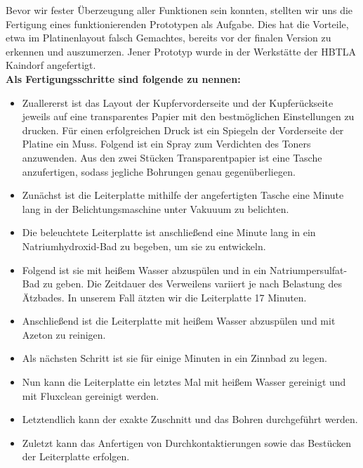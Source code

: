 Bevor wir fester Überzeugung aller Funktionen sein konnten, stellten wir uns die Fertigung eines funktionierenden Prototypen als Aufgabe.
Dies hat die Vorteile, etwa im Platinenlayout falsch Gemachtes, bereits vor der finalen Version zu erkennen und auszumerzen.
Jener Prototyp wurde in der Werkstätte der HBTLA Kaindorf angefertigt. \\

\textbf{Als Fertigungsschritte sind folgende zu nennen:}

\begin{itemize}
\item Zuallererst ist das Layout der Kupfervorderseite und der Kupferückseite jeweils auf eine transparentes Papier mit den bestmöglichen Einstellungen zu drucken.
Für einen erfolgreichen Druck ist ein Spiegeln der Vorderseite der Platine ein Muss.
Folgend ist ein Spray zum Verdichten des Toners anzuwenden.
Aus den zwei Stücken Transparentpapier ist eine Tasche anzufertigen, sodass jegliche Bohrungen genau gegenüberliegen. \\

\item Zunächst ist die Leiterplatte mithilfe der angefertigten Tasche eine Minute lang in der Belichtungsmaschine unter Vakuuum zu belichten. \\

\item Die beleuchtete Leiterplatte ist anschließend eine Minute lang in ein Natriumhydroxid-Bad zu begeben, um sie zu entwickeln. \\

\item Folgend ist sie mit heißem Wasser abzuspülen und in ein Natriumpersulfat-Bad zu geben.
Die Zeitdauer des Verweilens variiert je nach Belastung des Ätzbades.
In unserem Fall ätzten wir die Leiterplatte 17 Minuten. \\

\item Anschließend ist die Leiterplatte mit heißem Wasser abzuspülen und mit Azeton zu reinigen. \\

\item Als nächsten Schritt ist sie für einige Minuten in ein Zinnbad zu legen. \\

\item Nun kann die Leiterplatte ein letztes Mal mit heißem Wasser gereinigt und mit Fluxclean gereinigt werden.

\item Letztendlich kann der exakte Zuschnitt und das Bohren durchgeführt werden. \\

\item Zuletzt kann das Anfertigen von Durchkontaktierungen sowie das Bestücken der Leiterplatte erfolgen.
\end{itemize}

